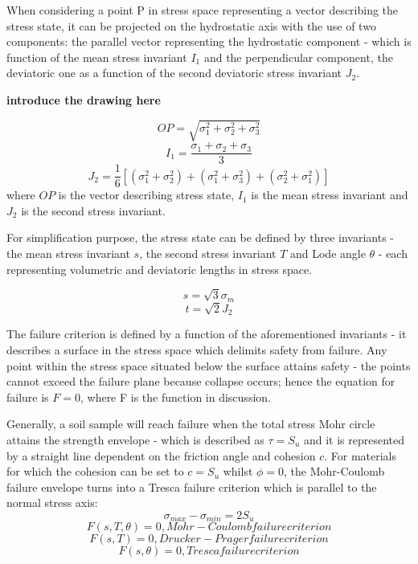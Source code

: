 \documentclass[12pt,a4paper]{report}
\begin{document}
When considering a point P in stress space representing a vector describing the stress state, it can be projected on the hydrostatic axis with the use of two components: the parallel vector representing the hydrostatic component - which is function of the mean stress invariant $I_1$ and the perpendicular component, the deviatoric one as a function of the second deviatoric stress invariant $J_2$.

\textbf{introduce the drawing here}

\begin{equation}
	OP=\sqrt{\sigma_1^2+\sigma_2^2+\sigma_3^2}
\end{equation}
\begin{equation}
	I_1=\frac{\sigma_1+\sigma_2+\sigma_3}{3} 	
\end{equation}
\begin{equation}
	 J_2=\frac{1}{6}[(\sigma_1^2+\sigma_2^2)+(\sigma_1^2+\sigma_3^2)+(\sigma_2^2+\sigma_1^2)] 
\end{equation}
where
$OP$ is  the vector describing stress state, $I_1$ is the mean stress invariant and $J_2$ is the second stress invariant.

For simplification purpose, the stress state can be defined by three invariants - the mean stress invariant $s$, the second stress invariant $T$ and Lode angle $\theta$ - each representing volumetric and deviatoric lengths in stress space.

\begin{equation}
	s=\sqrt{3}\sigma_m
\end{equation}
\begin{equation}
	t=\sqrt{2}J_2
\end{equation}

The failure criterion is defined by a function of the aforementioned invariants - it describes a surface in the stress space which delimits safety from failure. Any point within the stress space situated below the surface attains safety - the points cannot exceed the failure plane because collapse occurs; hence the equation for failure is $F = 0$, where F is the function in discussion. 

Generally, a soil sample will reach failure when the total stress Mohr circle attains the strength envelope - which is described as $\tau=S_u$ and it is represented by a straight line dependent on the friction angle and cohesion $c$. For materials for which the cohesion can be set to $c=S_u$ whilst $\phi=0$, the Mohr-Coulomb failure envelope turns into a Tresca failure criterion which is parallel to the normal stress axis:
\begin{equation}
	\sigma_{max}-\sigma_{min}=2S_u
\end{equation}
\begin{equation}
F(s,T,\theta)=0, Mohr-Coulomb failure criterion
\end{equation}
\begin{equation}
F(s,T)=0, Drucker-Prager failure criterion
\end{equation}
\begin{equation}
F(s,\theta)=0, Tresca failure criterion
\end{equation}
\end{document}
